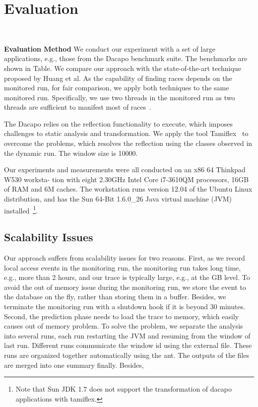 \section{Evaluation}~\label{sec:eval}

{\bf Evaluation Method} We conduct our experiment with a set of large applications, e.g.,  those from the {\sf Dacapo} benchmark suite. 
The benchmarks are shown in Table. We compare our approach with the state-of-the-art technique proposed by Huang et al. As the capability of finding races depends on the monitored run, for fair comparison, we 
 apply both techniques to the same monitored run. Specifically, we use two threads in the monitored run as two threads are sufficient to manifest most of races~\cite{shanlu}. 

The {\sf Dacapo} relies on the reflection functionality to execute, which imposes challenges to static analysis and transformation. We apply the tool {\sf Tamiflex}~\cite{} to overcome the problems, which resolves the reflection using the classes observed in the dynamic run. The window size is 10000.


Our experiments and measurements 
were all conducted on an x86 64 Thinkpad W530 worksta- 
tion with eight 2.30GHz Intel Core i7-3610QM processors, 
16GB of RAM and 6M caches. The workstation runs version 12.04 of the Ubuntu Linux distribution, and has the Sun 
64-Bit 1.6.0\_26 Java virtual machine (JVM) installed~\footnote{Note that Sun JDK 1.7 does not support the transformation of dacapo applications with {\sf tamiflex}.}. 




\subsection{Scalability Issues}
Our approach suffers from scalability issues for two reasons. First, as we record local access events in the monitoring run,  the monitoring run takes long time, e.g., more than 2 hours, and our trace is typically large, e.g., at the GB level. To avoid the out of memory issue during the monitoring run, we store the event to the database on the fly, rather than storing them in a buffer. Besides, we terminate the monitoring run with a shutdown hook if it is beyond 30 minutes. Second,  the prediction phase needs to load the trace to memory, which easily causes out of memory problem. To solve the problem, we separate the analysis into several runs, each run restarting the JVM and resuming from the window of last run. Different runs communicate the window id using the external file. These runs are organized together automatically using the ant. The outputs of the files are merged into one summary finally. Besides, 



